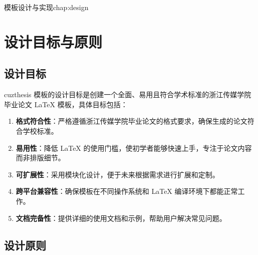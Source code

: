 \begin{cuzchapter}{模板设计与实现}{chap:design}


    \section{设计目标与原则}\label{sec:design-goals}
    
    \subsection{设计目标}
    
    cuzthesis 模板的设计目标是创建一个全面、易用且符合学术标准的浙江传媒学院毕业论文 LaTeX 模板，具体目标包括：
    
    \begin{enumerate}
        \item \textbf{格式符合性}：严格遵循浙江传媒学院毕业论文的格式要求，确保生成的论文符合学校标准。
        
        \item \textbf{易用性}：降低 LaTeX 的使用门槛，使初学者能够快速上手，专注于论文内容而非排版细节。
        
        \item \textbf{可扩展性}：采用模块化设计，便于未来根据需求进行扩展和定制。
        
        \item \textbf{跨平台兼容性}：确保模板在不同操作系统和 LaTeX 编译环境下都能正常工作。
        
        \item \textbf{文档完备性}：提供详细的使用文档和示例，帮助用户解决常见问题。
    \end{enumerate}
    
    \subsection{设计原则}
    

\end{cuzchapter}
